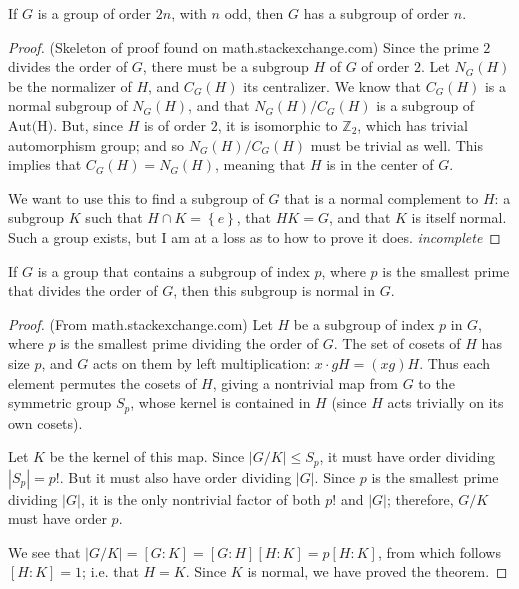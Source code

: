 \documentclass[12pt]{article}
\newcommand{\Z}{\mathbb{Z}}
\theoremstyle{definition}
\newenvironment{problem}[2][Problem]{\begin{trivlist}
\item[\hskip \labelsep {\bfseries #1}\hskip \labelsep {\bfseries #2.}]}{\end{trivlist}}
\begin{document}
\begin{problem}{15}
If $G$ is a group of order $2n$, with $n$ odd, then $G$ has a subgroup of order $n$.
\begin{proof}
	(Skeleton of proof found on math.stackexchange.com) Since the prime $2$ divides the order of $G$, there must be a subgroup $H$ of $G$ of order $2$. Let $N_G(H)$ be the normalizer of $H$, and $C_G(H)$ its centralizer. We know that $C_G(H)$ is a normal subgroup of $N_G(H)$, and that $N_G(H) / C_G(H)$ is a subgroup of $\text{Aut(H)}$. But, since $H$ is of order $2$, it is isomorphic to $\Z_2$, which has trivial automorphism group; and so $N_G(H)/C_G(H)$ must be trivial as well. This implies that $C_G(H) = N_G(H)$, meaning that $H$ is in the center of $G$.
	\par We want to use this to find a subgroup of $G$ that is a normal complement to $H$: a subgroup $K$ such that $H \cap K = \left\{ e \right\}$, that $HK = G$, and that $K$ is itself normal. Such a group exists, but I am at a loss as to how to prove it does.
	\textit{incomplete}
\end{proof}
\end{problem}
\begin{problem}{16}
If $G$ is a group that contains a subgroup of index $p$, where $p$ is the smallest prime that divides the order of $G$, then this subgroup is normal in $G$.
\begin{proof}
	(From math.stackexchange.com) Let $H$ be a subgroup of index $p$ in $G$, where $p$ is the smallest prime dividing the order of $G$. The set of cosets of $H$ has size $p$, and $G$ acts on them by left multiplication: $x \cdot gH = (xg)H$. Thus each element permutes the cosets of $H$, giving a nontrivial map from $G$ to the symmetric group $S_p$, whose kernel is contained in $H$ (since $H$ acts trivially on its own cosets).
	\par Let $K$ be the kernel of this map. Since $\left \lvert { G/K } \right \lvert  \leq S_p$, it must have order dividing $\left \lvert { S_p } \right \lvert  = p!$. But it must also have order dividing $\left \lvert { G } \right \lvert $. Since $p$ is the smallest prime dividing $\left \lvert { G } \right \lvert $, it is the only nontrivial factor of both $p!$ and $\left \lvert { G } \right \lvert $; therefore, $G/K$ must have order $p$. 
	\par We see that $\left \lvert { G/K } \right \lvert  = [G:K] = [G:H][H:K] = p[H:K]$, from which follows $[H:K] = 1$; i.e. that $H = K$. Since $K$ is normal, we have proved the theorem.
\end{proof}
\end{problem}
\end{document}

